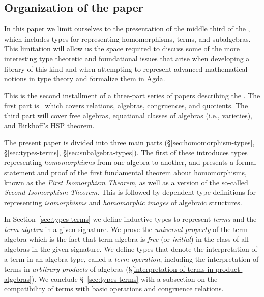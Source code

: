 \subsection{Organization of the paper}\label{sec:organization}

In this paper we limit ourselves to the presentation of the middle third of the \ualib, which includes types for representing homomorphisms, terms, and subalgebras. This limitation will allow us the space required to discuss some of the more interesting type theoretic and foundational issues that arise when developing a library of this kind and when attempting to represent advanced mathematical notions in type theory and formalize them in Agda.

This is the second installment of a three-part series of papers describing the \agdaualib. The first part is~\cite{DeMeo:2021-1} which covers relations, algebras, congruences, and quotients. The third part will cover free algebras, equational classes of algebras (i.e., varieties), and Birkhoff's HSP theorem.

The present paper is divided into three main parts (\S\ref{sec:homomorphism-types}, \S\ref{sec:types-terms}, \S\ref{sec:subalgebra-types}).  The first of these introduces types representing \emph{homomorphisms} from one algebra to another, and presents a formal statement and proof of the first fundamental theorem about homomorphisms, known as the \emph{First Isomorphism Theorem}, as well as a version of the so-called \emph{Second Isomorphism Theorem}. This is followed by dependent type definitions for representing \emph{isomorphisms} and \emph{homomorphic images} of algebraic structures.

In Section~\ref{sec:types-terms} we define inductive types to represent \emph{terms} and the \emph{term algebra} in a given signature. We prove the \emph{universal property} of the term algebra which is the fact that term algebra is \emph{free} (or \emph{initial}) in the class of all algebras in the given signature.  We define types that denote the interpretation of a term in an algebra type, called a \emph{term operation}, including the interpretation of terms in \emph{arbitrary products} of algebras (\S\ref{interpretation-of-terms-in-product-algebras}). We conclude \S~\ref{sec:types-terms} with a subsection on the compatibility of terms with basic operations and congruence relations.

